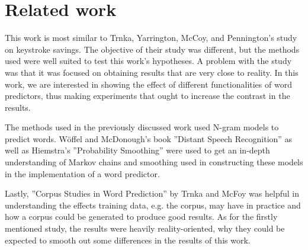 \section{Related work}

This work is most similar to Trnka, Yarrington, McCoy, and Pennington's study \cite{keystrokes} on keystroke savings. The objective of their study was different, but the methods used were well suited to test this work's hypotheses. A problem with the study was that it was focused on obtaining results that are very close to reality. In this work, we are interested in showing the effect of different functionalities of word predictors, thus making experiments that ought to increase the contrast in the results.

The methods used in the previously discussed work used N-gram models to predict words. Wöffel and McDonough's book ''Distant Speech Recognition'' \cite{search} as well as Hiemstra's ''Probability Smoothing'' \cite{smoothing} were used to get an in-depth understanding of Markov chains and smoothing used in constructing these models in the implementation of a word predictor.

Lastly, ''Corpus Studies in Word Prediction'' by Trnka and McFoy \cite{corpus} was helpful in understanding the effects training data, e.g. the corpus, may have in practice and how a corpus could be generated to produce good results. As for the firstly mentioned study, the results were heavily reality-oriented, why they could be expected to smooth out some differences in the results of this work.